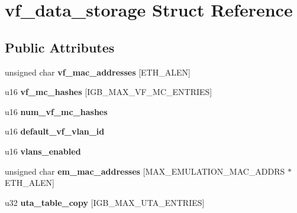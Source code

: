 \hypertarget{structvf__data__storage}{
\section{vf\_\-data\_\-storage Struct Reference}
\label{structvf__data__storage}
}
\subsection*{Public Attributes}
\begin{DoxyCompactItemize}
\item 
\hypertarget{structvf__data__storage_a27af9e08e8fa90042db13dfec37ffb34}{
unsigned char {\bfseries vf\_\-mac\_\-addresses} \mbox{[}ETH\_\-ALEN\mbox{]}}
\label{structvf__data__storage_a27af9e08e8fa90042db13dfec37ffb34}

\item 
\hypertarget{structvf__data__storage_a3c2192cca5cd7d8aa4be32b5a949200e}{
u16 {\bfseries vf\_\-mc\_\-hashes} \mbox{[}IGB\_\-MAX\_\-VF\_\-MC\_\-ENTRIES\mbox{]}}
\label{structvf__data__storage_a3c2192cca5cd7d8aa4be32b5a949200e}

\item 
\hypertarget{structvf__data__storage_a11110dae4f94bf03439a40d9c4871175}{
u16 {\bfseries num\_\-vf\_\-mc\_\-hashes}}
\label{structvf__data__storage_a11110dae4f94bf03439a40d9c4871175}

\item 
\hypertarget{structvf__data__storage_a4ff4c35af70f456a327532eb6780967f}{
u16 {\bfseries default\_\-vf\_\-vlan\_\-id}}
\label{structvf__data__storage_a4ff4c35af70f456a327532eb6780967f}

\item 
\hypertarget{structvf__data__storage_a2b3b0b7d8a25c76c81e9caf4de330e0c}{
u16 {\bfseries vlans\_\-enabled}}
\label{structvf__data__storage_a2b3b0b7d8a25c76c81e9caf4de330e0c}

\item 
\hypertarget{structvf__data__storage_aafa8cb049c30ea0b915616e6871a9747}{
unsigned char {\bfseries em\_\-mac\_\-addresses} \mbox{[}MAX\_\-EMULATION\_\-MAC\_\-ADDRS $\ast$ETH\_\-ALEN\mbox{]}}
\label{structvf__data__storage_aafa8cb049c30ea0b915616e6871a9747}

\item 
\hypertarget{structvf__data__storage_a0cdcd3aa5e47fd7b9c517fd68162c560}{
u32 {\bfseries uta\_\-table\_\-copy} \mbox{[}IGB\_\-MAX\_\-UTA\_\-ENTRIES\mbox{]}}
\label{structvf__data__storage_a0cdcd3aa5e47fd7b9c517fd68162c560}


\end{DoxyCompactItemize}
